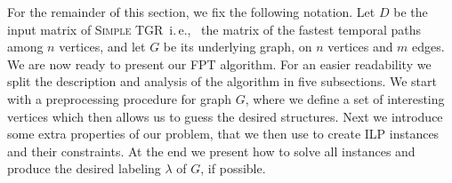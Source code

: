 \documentclass[a4paper,UKenglish,cleveref, autoref, thm-restate,anonymous]{lipics-v2021}
\newcommand{\ie}{i.\,e.,\ }
\newcommand{\deltaExact}{\textsc{Simple TGR}}
\begin{document}
For the remainder of this section, we fix the following notation. 
Let $D$ be the input matrix of \deltaExact\ \ie
the matrix of the fastest temporal paths among $n$ vertices, and let $G$ be its underlying graph, on $n$ vertices and $m$ edges.
We are now ready to present our FPT algorithm. For an easier readability we split the description and analysis of the algorithm in five subsections.
We start with a preprocessing procedure for graph $G$, where we define a set of interesting vertices which then allows us to guess the desired structures.
Next we introduce some extra properties of our problem, that we then use to create ILP instances and their constraints.
At the end we present how to solve all instances and produce the desired labeling $\lambda$ of $G$, if possible.
\end{document}
